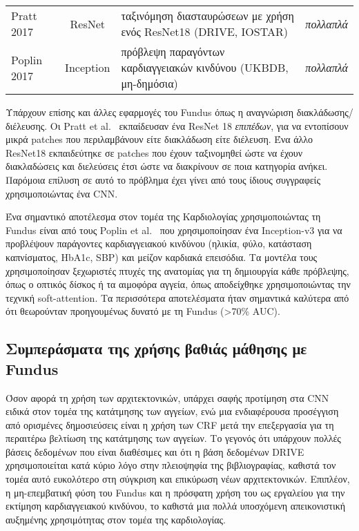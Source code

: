 \begin{sidewaystable}
\begin{tabular}{l c l l}
		Pratt 2017~\cite{pratt2017automatica}             & ResNet          & ταξινόμηση διασταυρώσεων με χρήση ενός ResNet18 (DRIVE, IOSTAR)                                               & \textit{πολλαπλά}                                   \\
		Poplin 2017~\cite{poplin2017predicting}           & Inception       & πρόβλεψη παραγόντων καρδιαγγειακών κινδύνου (UKBDB, μη-δημόσια)                                               & \textit{πολλαπλά}                                   \\
		\bottomrule
	\end{tabular}
\end{sidewaystable}

Υπάρχουν επίσης και άλλες εφαρμογές του Fundus όπως η αναγνώριση διακλάδωσης/διέλευσης.
Οι Pratt et al.~\cite{pratt2017automatica} εκπαίδευσαν ένα ResNet 18 \textit{επιπέδων}, για να εντοπίσουν μικρά patches που περιλαμβάνουν είτε διακλάδωση είτε διέλευση.
Ένα άλλο ResNet18 εκπαιδεύτηκε σε patches που έχουν ταξινομηθεί ώστε να έχουν διακλαδώσεις και διελεύσεις έτσι ώστε να διακρίνουν σε ποια κατηγορία ανήκει.
Παρόμοια επίλυση σε αυτό το πρόβλημα έχει γίνει από τους ίδιους συγγραφείς~\cite{pratt2017automaticb} χρησιμοποιώντας ένα CNN\@.

Ένα σημαντικό αποτέλεσμα στον τομέα της Καρδιολογίας χρησιμοποιώντας τη Fundus είναι από τους Poplin et al.~\cite{poplin2017predicting} που χρησιμοποίησαν ένα Inception-v3 για να προβλέψουν παράγοντες καρδιαγγειακού κινδύνου (ηλικία, φύλο, κατάσταση καπνίσματος, HbA1c, SBP) και μείζον καρδιακά επεισόδια.
Τα μοντέλα τους χρησιμοποίησαν ξεχωριστές πτυχές της ανατομίας για τη δημιουργία κάθε πρόβλεψης, όπως ο οπτικός δίσκος ή τα αιμοφόρα αγγεία, όπως αποδείχθηκε χρησιμοποιώντας την τεχνική soft-attention.
Τα περισσότερα αποτελέσματα ήταν σημαντικά καλύτερα από ότι θεωρούνταν προηγουμένως δυνατό με τη Fundus (\textgreater{70\%} AUC).

\subsection{Συμπεράσματα της χρήσης βαθιάς μάθησης με Fundus}
Όσον αφορά τη χρήση των αρχιτεκτονικών, υπάρχει σαφής προτίμηση στα CNN ειδικά στον τομέα της κατάτμησης των αγγείων, ενώ μια ενδιαφέρουσα προσέγγιση από ορισμένες δημοσιεύσεις είναι η χρήση των CRF μετά την επεξεργασία για τη περαιτέρω βελτίωση της κατάτμησης των αγγείων.
Το γεγονός ότι υπάρχουν πολλές βάσεις δεδομένων που είναι διαθέσιμες και ότι η βάση δεδομένων DRIVE χρησιμοποιείται κατά κύριο λόγο στην πλειοψηφία της βιβλιογραφίας, καθιστά τον τομέα αυτό ευκολότερο στη σύγκριση και επικύρωση νέων αρχιτεκτονικών.
Επιπλέον, η μη-επεμβατική φύση του Fundus και η πρόσφατη χρήση του ως εργαλείου για την εκτίμηση καρδιαγγειακού κινδύνου, το καθιστά μια πολλά υποσχόμενη απεικονιστική αυξημένης χρησιμότητας στον τομέα της καρδιολογίας.

